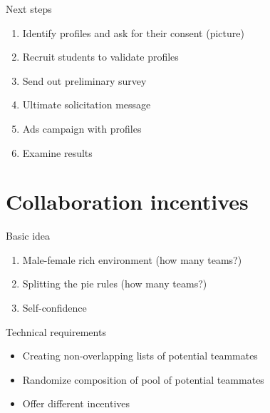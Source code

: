 \begin{frame}{Next steps}

\begin{enumerate}
\def\labelenumi{\arabic{enumi}.}
\tightlist
\item
  Identify profiles and ask for their consent (picture)
\item
  Recruit students to validate profiles
\item
  Send out preliminary survey
\item
  Ultimate solicitation message
\item
  Ads campaign with profiles
\item
  Examine results
\end{enumerate}

\end{frame}

\section{Collaboration incentives}\label{collaboration-incentives}

\begin{frame}{Basic idea}

\begin{enumerate}
\def\labelenumi{\arabic{enumi}.}
\tightlist
\item
  Male-female rich environment (how many teams?)
\item
  Splitting the pie rules (how many teams?)
\item
  Self-confidence
\end{enumerate}

\end{frame}

\begin{frame}{Technical requirements}

\begin{itemize}
\tightlist
\item
  Creating non-overlapping lists of potential teammates
\item
  Randomize composition of pool of potential teammates
\item
  Offer different incentives
\end{itemize}

\end{frame}

